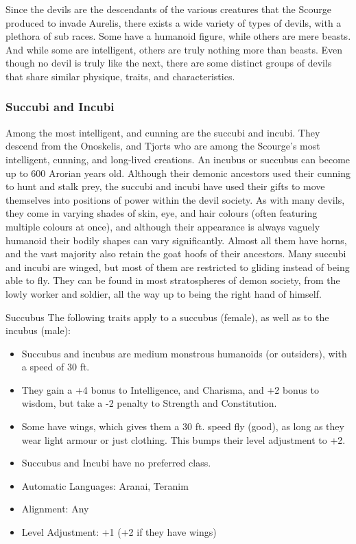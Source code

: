 Since the devils are the descendants of the various creatures that the Scourge
produced to invade Aurelis, there exists a wide variety of types of devils,
with a plethora of sub races. Some have a humanoid figure, while others are
mere beasts. And while some are intelligent, others are truly nothing more
than beasts. Even though no devil is truly like the next, there are some
distinct groups of devils that share similar physique, traits, and
characteristics.

\subsubsection{Succubi and Incubi}

Among the most intelligent, and cunning are the succubi and incubi. They
descend from the Onoskelis, and Tjorts who are among the Scourge's most
intelligent, cunning, and long-lived creations. An incubus or succubus can
become up to 600 Arorian years old. Although their demonic ancestors used
their cunning to hunt and stalk prey, the succubi and incubi have used their
gifts to move themselves into positions of power within the devil society.  As
with many devils, they come in varying shades of skin, eye, and hair colours
(often featuring multiple colours at once), and although their appearance is
always vaguely humanoid their bodily shapes can vary significantly. Almost all
them have horns, and the vast majority also retain the goat hoofs of their
ancestors. Many succubi and incubi are winged, but most of them are restricted
to gliding instead of being able to fly. They can be found in most
stratospheres of demon society, from the lowly worker and soldier, all the way
up to being the right hand of  himself.

\begin{35e}{Succubus}
  The following traits apply to a succubus (female), as well as to the incubus
  (male):
  \begin{itemize}[noitemsep]
  \item Succubus and incubus are medium monstrous humanoids (or outsiders), with
    a speed of 30 ft.
  \item They gain a +4 bonus to Intelligence, and Charisma, and +2 bonus to
    wisdom, but take a -2 penalty to Strength and Constitution.
  \item Some have wings, which gives them a 30 ft. speed fly (good), as long
    as they wear light armour or just clothing. This bumps their level adjustment
    to +2.
  \item Succubus and Incubi have no preferred class.
  \item Automatic Languages: Aranai, Teranim
  \item Alignment: Any
  \item Level Adjustment: +1 (+2 if they have wings)
  \end{itemize}
\end{35e}

